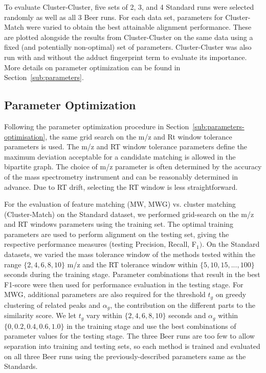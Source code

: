 To evaluate Cluster-Cluster, five sets of 2, 3, and 4 Standard runs were selected randomly as well as all 3 Beer runs. For each data set, parameters for Cluster-Match were varied to obtain the best attainable alignment performance. These are plotted alongside the results from Cluster-Cluster on the same data using a fixed (and potentially non-optimal) set of parameters. Cluster-Cluster was also run with and without the adduct fingerprint term to evaluate its importance. More details on parameter optimization can be found in Section~\ref{sub:parameters}.

\subsection{Parameter Optimization\label{sub:parameters}}

Following the parameter optimization procedure in Section~\ref{sub:parameters-optimisation}, the same grid search on the m/z and Rt window tolerance parameters is used.  The m/z and RT window tolerance parameters define the maximum deviation acceptable for a candidate matching is allowed in the bipartite graph. The choice of m/z parameter is often determined by the accuracy of the mass spectrometry instrument and can be reasonably determined in advance. Due to RT drift, selecting the RT window is less straightforward. 

For the evaluation of feature matching (MW, MWG) vs. cluster matching (Cluster-Match) on the Standard dataset, we performed grid-search on the m/z and RT windows parameters using the training set. The optimal training parameters are used to perform alignment on the testing set, giving the respective performance measures (testing Precision, Recall, F$_{1})$. On the Standard datasets, we varied the mass tolerance window of the methods tested within the range $\{2,4,6,8,10\}$ m/z and the RT tolerance window within $\{5,10,15,...,100\}$ seconds during the training stage. Parameter combinations that result in the best F1-score were then used for performance evaluation in the testing stage. For MWG, additional parameters are also required for the threshold $t_{g}$ on greedy clustering of related peaks and $\alpha_{g}$, the contribution on the different parts to the similarity score. We let $t_{g}$ vary within $\{2,4,6,8,10\}$ seconds and $\alpha_{g}$ within $\{0,0.2,0.4,0.6,1.0\}$ in the training stage and use the best combinations of parameter values for the testing stage. The three Beer runs are too few to allow separation into training and testing sets, so each method is trained and evaluated on all three Beer runs using the previously-described parameters same as the Standards.

